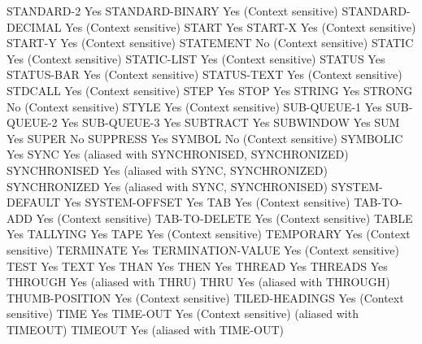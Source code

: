 STANDARD-2                      Yes
STANDARD-BINARY                 Yes (Context sensitive)
STANDARD-DECIMAL                Yes (Context sensitive)
START                           Yes
START-X                         Yes (Context sensitive)
START-Y                         Yes (Context sensitive)
STATEMENT                       No (Context sensitive)
STATIC                          Yes (Context sensitive)
STATIC-LIST                     Yes (Context sensitive)
STATUS                          Yes
STATUS-BAR                      Yes (Context sensitive)
STATUS-TEXT                     Yes (Context sensitive)
STDCALL                         Yes (Context sensitive)
STEP                            Yes
STOP                            Yes
STRING                          Yes
STRONG                          No (Context sensitive)
STYLE                           Yes (Context sensitive)
SUB-QUEUE-1                     Yes
SUB-QUEUE-2                     Yes
SUB-QUEUE-3                     Yes
SUBTRACT                        Yes
SUBWINDOW                       Yes
SUM                             Yes
SUPER                           No
SUPPRESS                        Yes
SYMBOL                          No (Context sensitive)
SYMBOLIC                        Yes
SYNC                            Yes (aliased with SYNCHRONISED, SYNCHRONIZED)
SYNCHRONISED                    Yes (aliased with SYNC, SYNCHRONIZED)
SYNCHRONIZED                    Yes (aliased with SYNC, SYNCHRONISED)
SYSTEM-DEFAULT                  Yes
SYSTEM-OFFSET                   Yes
TAB                             Yes (Context sensitive)
TAB-TO-ADD                      Yes (Context sensitive)
TAB-TO-DELETE                   Yes (Context sensitive)
TABLE                           Yes
TALLYING                        Yes
TAPE                            Yes (Context sensitive)
TEMPORARY                       Yes (Context sensitive)
TERMINATE                       Yes
TERMINATION-VALUE               Yes (Context sensitive)
TEST                            Yes
TEXT                            Yes
THAN                            Yes
THEN                            Yes
THREAD                          Yes
THREADS                         Yes
THROUGH                         Yes (aliased with THRU)
THRU                            Yes (aliased with THROUGH)
THUMB-POSITION                  Yes (Context sensitive)
TILED-HEADINGS                  Yes (Context sensitive)
TIME                            Yes
TIME-OUT                        Yes (Context sensitive) (aliased with TIMEOUT)
TIMEOUT                         Yes (aliased with TIME-OUT)

